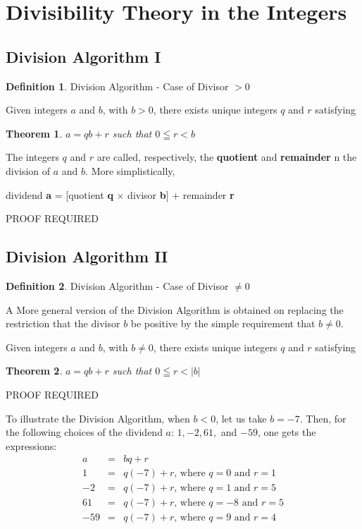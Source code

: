\documentclass{book}
\newtheorem{theorem}{Theorem}[section]
\theoremstyle{definition}
\newtheorem{definition}{Definition}[section]
\theoremstyle{remark}
\begin{document}
\newpage
\section{Divisibility Theory in the Integers}
\subsection{Division Algorithm I}
\begin{definition}
Division Algorithm - Case of Divisor $> 0$

Given integers $a$ and $b$, with $b>0$, there exists unique integers $q$ and $r$ satisfying 
\begin{tcolorbox}
	\begin{theorem}
		$a = qb + r$ such that $0 \leqq r < b$
	\end{theorem}
\end{tcolorbox}
The integers $q$ and $r$ are called, respectively, the {\bf quotient} and {\bf remainder} n the division of $a$ and $b$. More simplistically, 
	\begin{center}
		dividend {\bf a} = [quotient {\bf q} $\times$ divisor {\bf b}] + remainder {\bf r}	
	\end{center}
PROOF REQUIRED
\end{definition} 



\subsection{Division Algorithm II}
\begin{definition}
Division Algorithm - Case of Divisor $ \neq 0$

A More general version of the Division Algorithm is obtained on replacing the restriction that the divisor $b$ be positive by the simple requirement that $b \neq 0$. 

Given integers $a$ and $b$, with $b \neq 0$, there exists unique integers $q$ and $r$ satisfying 
\begin{tcolorbox}
	\begin{theorem}
		$a = qb + r$ such that $0 \leqq r < |b|$
	\end{theorem} 
\end{tcolorbox}
PROOF REQUIRED


To illustrate the Division Algorithm, when $b < 0$, let us take $b=-7$. Then, for the following choices of the dividend $a$: $1,-2,61,$ and $-59$, one gets the expressions:
	\begin{eqnarray*}
		a & = & bq + r \nonumber \\		
		1 & = & q(-7) + r \text{, where }q=0 \text{ and } r=1  \nonumber \\	
		-2 & = & q(-7) + r \text{, where }q=1 \text{ and } r=5  \nonumber \\	
		61 & = & q(-7) + r \text{, where }q=-8 \text{ and } r=5  \nonumber \\	
		-59 & = & q(-7) + r \text{, where }q=9 \text{ and } r=4  \nonumber \\	
	\end{eqnarray*}
\end{definition} 
\end{document}
